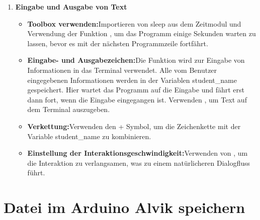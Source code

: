 \begin{enumerate}
	\item \textbf{Eingabe und Ausgabe von Text}
	\begin{itemize}
		\item \textbf{Toolbox verwenden:}Importieren von sleep aus dem Zeitmodul und Verwendung der Funktion , um das Programm einige Sekunden warten zu lassen, bevor es mit der nächsten Programmzeile fortfährt.
		\item \textbf{Eingabe- und Ausgabezeichen:}Die Funktion  wird zur Eingabe von Informationen in das Terminal verwendet. Alle vom Benutzer eingegebenen Informationen werden in der Variablen student\_name gespeichert. Hier wartet das Programm auf die Eingabe und fährt erst dann fort, wenn die Eingabe eingegangen ist. Verwenden , um Text auf dem Terminal auszugeben.
		\item \textbf{Verkettung:}Verwenden den + Symbol, um die Zeichenkette mit der Variable student\_name zu kombinieren.
		\item \textbf{Einstellung der Interaktionsgeschwindigkeit:}Verwenden von , um die Interaktion zu verlangsamen, was zu einem natürlicheren Dialogfluss führt.
		
	\end{itemize}
\end{enumerate}	

\section{Datei im Arduino Alvik speichern}

